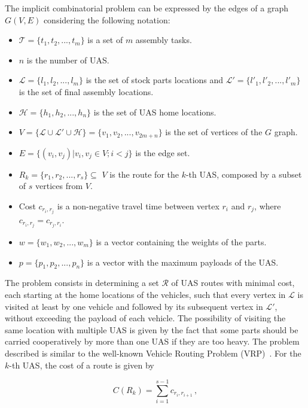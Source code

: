 \documentclass[letterpaper, 12pt, conference]{ieeeconf}    %
\begin{document}
The implicit combinatorial problem can be expressed by the edges of a graph $G(V,E)$ considering the following notation:
    
    \begin{itemize}
    	\item $\mathcal{T} = \{t_1, t_2, ..., t_m\}$ is a set of $m$ assembly tasks.
    	\item $n$ is the number of UAS.
    	\item $\mathcal{L} = \{l_1, l_2, ..., l_m\}$ is the set of stock parts locations and $\mathcal{L'} = \{l'_1, l'_2, ..., l'_m\}$ is the set of final assembly locations.    
    	\item $\mathcal{H} = \{h_1, h_2, ..., h_n\}$ is the set of UAS home locations.
  		\item $V=\{\mathcal{L}\cup\mathcal{L'}\cup\mathcal{H}\}=\{v_1, v_2, ..., v_{2m+n}\}$ is the set of vertices of the $G$ graph.
		\item $E=\{(v_i,v_j) | v_i,v_j \in V; i<j\}$ is the edge set.  		
  		\item ${R_{k} = \{r_1, r_2, ..., r_s} \}\subseteq$ $V$ is the route for the $k$-th UAS, composed by a subset of $s$ vertices from $V$.
		\item Cost $c_{r_i,r_j}$ is a non-negative travel time between vertex $r_i$ and $r_j$, where $c_{r_i,r_j}=c_{r_j,r_i}$.
		\item $w = \{w_1, w_2, ..., w_m\}$ is a vector containing the weights of the parts.	
		\item $p = \{p_1, p_2, ..., p_n\}$ is a vector with the maximum payloads of the UAS.
	\end{itemize}
	
	The problem consists in determining a set $\mathcal{R}$ of UAS routes with minimal cost, each starting at the home locations of the vehicles, such that every vertex in $\mathcal{L}$ is visited at least by one vehicle and followed by its subsequent vertex in $\mathcal{L'}$, without exceeding the payload of each vehicle. The possibility of visiting the same location with multiple UAS is given by the fact that some parts should be carried cooperatively by more than one UAS if they are too heavy. The problem described is similar to the well-known Vehicle Routing Problem (VRP)~\cite{Dantzig_Ramser_VRP}.	
	For the $k$-th UAS, the cost of a route is given by 

 \begin{equation}
 	{C(R_{k}) = \sum_{i=1}^{s-1} c_{r_i,r_{i+1}}} \, ,
 	\label{eq:route_cost}
 \end{equation}	
\end{document}
